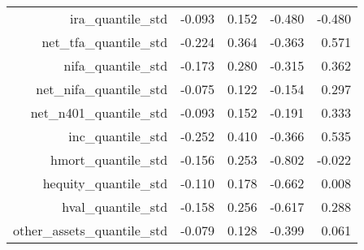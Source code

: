\begin{table}[ht]
\begin{tabular}{rrrrr}
  ira\_quantile\_std & -0.093 & 0.152 & -0.480 & -0.480 \\ 
  net\_tfa\_quantile\_std & -0.224 & 0.364 & -0.363 & 0.571 \\ 
  nifa\_quantile\_std & -0.173 & 0.280 & -0.315 & 0.362 \\ 
  net\_nifa\_quantile\_std & -0.075 & 0.122 & -0.154 & 0.297 \\ 
  net\_n401\_quantile\_std & -0.093 & 0.152 & -0.191 & 0.333 \\ 
  inc\_quantile\_std & -0.252 & 0.410 & -0.366 & 0.535 \\ 
  hmort\_quantile\_std & -0.156 & 0.253 & -0.802 & -0.022 \\ 
  hequity\_quantile\_std & -0.110 & 0.178 & -0.662 & 0.008 \\ 
  hval\_quantile\_std & -0.158 & 0.256 & -0.617 & 0.288 \\ 
  other\_assets\_quantile\_std & -0.079 & 0.128 & -0.399 & 0.061 \\ 
   \hline
\end{tabular}
\end{table}
